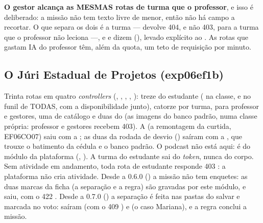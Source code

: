\begin{regra}
\textbf{O gestor alcança as MESMAS rotas de turma que o professor}, e isso é
deliberado: a missão não tem texto livre de menor, então não há campo a
recortar. O que separa os dois é a turma ---  devolve 404, e
não 403, para a turma que o professor não leciona ---, e  e
 dizem  (), levado explícito
ao . As rotas que gastam IA do professor têm, além da quota, um
teto de requisição por minuto.
\end{regra}

\subsection{O Júri Estadual de Projetos (exp06ef1b)}
\label{sec:api-juri-estadual}


Trinta rotas em quatro \emph{controllers} (,
, , , ): treze do
estudante ( na classe, e  no
funil  de TODAS, com a disponibilidade junto), catorze por
turma, para professor e gestores, uma de catálogo e duas do  (as
imagens do banco padrão,  numa classe própria: professor e
gestores recebem 403). A  (a remontagem da curtida, EF06CO07) saiu com a
; as duas da rodada de desvio () saíram com a
, que trouxe o batimento da cédula e o banco padrão. O podcast não está aqui: é do módulo da plataforma
(, ). A turma do estudante sai do
\emph{token}, nunca do corpo. Sem atividade em andamento, toda rota de estudante
responde 403 : a plataforma não cria atividade.
Desde a 0.6.0 () a missão não tem enquetes: as duas marcas da
ficha (a separação e a regra) são gravadas por este módulo, e
 saiu, com o 422 .
Desde a 0.7.0 () a separação é feita nas pastas do salvar e
marcada no voto: saíram  (com o 409
) e  (o caso
Mariana), e a regra conclui a missão.

